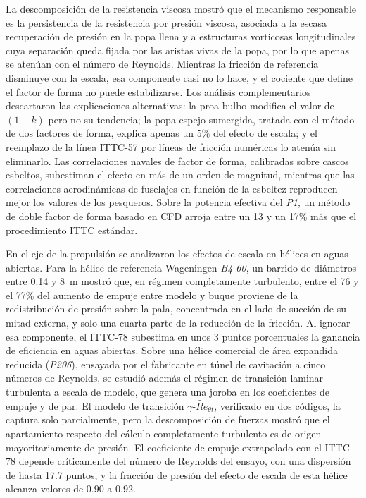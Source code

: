 \begin{ResumenPlantilla}
La descomposición de la resistencia viscosa mostró que el mecanismo responsable
es la persistencia de la resistencia por presión viscosa, asociada a la escasa
recuperación de presión en la popa llena y a estructuras vorticosas
longitudinales cuya separación queda fijada por las aristas vivas de la popa,
por lo que apenas se atenúan con el número de Reynolds. Mientras la fricción de
referencia disminuye con la escala, esa componente casi no lo hace, y el cociente
que define el factor de forma no puede estabilizarse. Los análisis
complementarios descartaron las explicaciones alternativas: la proa bulbo
modifica el valor de $(1+k)$ pero no su tendencia; la popa espejo sumergida,
tratada con el método de dos factores de forma, explica apenas un 5\% del efecto
de escala; y el reemplazo de la línea ITTC-57 por líneas de fricción numéricas lo
atenúa sin eliminarlo. Las correlaciones navales de factor de forma, calibradas
sobre cascos esbeltos, subestiman el efecto en más de un orden de magnitud,
mientras que las correlaciones aerodinámicas de fuselajes en función de la
esbeltez reproducen mejor los valores de los pesqueros. Sobre la potencia
efectiva del \textit{P1}, un método de doble factor de forma basado en CFD
arroja entre un 13 y un 17\% más que el procedimiento ITTC estándar.

En el eje de la propulsión se analizaron los efectos de escala en hélices en
aguas abiertas. Para la hélice de referencia Wageningen \textit{B4-60}, un
barrido de diámetros entre 0.14 y 8~m mostró que, en régimen completamente
turbulento, entre el 76 y el 77\% del aumento de empuje entre modelo y buque
proviene de la redistribución de presión sobre la pala, concentrada en el lado
de succión de su mitad externa, y solo una cuarta parte de la reducción de la
fricción. Al ignorar esa componente, el ITTC-78 subestima en unos 3 puntos
porcentuales la ganancia de eficiencia en aguas abiertas. Sobre una hélice
comercial de área expandida reducida (\textit{P206}), ensayada por el fabricante
en túnel de cavitación a cinco números de Reynolds, se estudió además el régimen
de transición laminar-turbulenta a escala de modelo, que genera una joroba en
los coeficientes de empuje y de par. El modelo de transición
$\gamma$-$\widetilde{Re}_{\theta t}$, verificado en dos códigos, la captura solo
parcialmente, pero la descomposición de fuerzas mostró que el apartamiento
respecto del cálculo completamente turbulento es de origen mayoritariamente de
presión. El coeficiente de empuje extrapolado con el ITTC-78 depende
críticamente del número de Reynolds del ensayo, con una dispersión de hasta 17.7
puntos, y la fracción de presión del efecto de escala de esta hélice alcanza
valores de 0.90 a 0.92.


\end{ResumenPlantilla}
